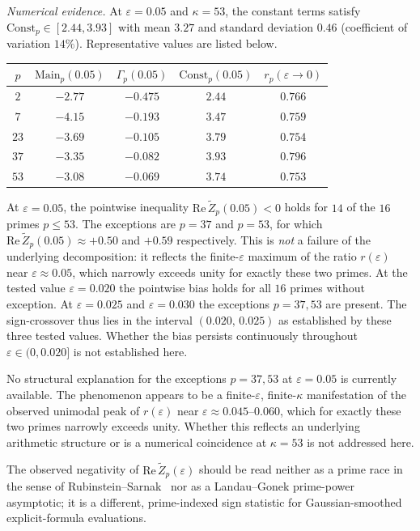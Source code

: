 \documentclass[11pt]{article}
\newcommand{\Zt}{\widetilde{Z}}
\begin{document}
\emph{Numerical evidence.}
At $\varepsilon=0.05$ and $\kappa=53$, the constant terms satisfy
$\mathrm{Const}_p\in[2.44,3.93]$ with mean $3.27$ and standard
deviation $0.46$ (coefficient of variation $14\%$).
Representative values are listed below.

\begin{center}
\begin{tabular}{ccccc}
\toprule
$p$ & $\mathrm{Main}_p(0.05)$ & $\Gamma_p(0.05)$
    & $\mathrm{Const}_p(0.05)$ & $r_p(\varepsilon\to 0)$ \\
\midrule
$2$  & $-2.77$ & $-0.475$ & $2.44$ & $0.766$ \\
$7$  & $-4.15$ & $-0.193$ & $3.47$ & $0.759$ \\
$23$ & $-3.69$ & $-0.105$ & $3.79$ & $0.754$ \\
$37$ & $-3.35$ & $-0.082$ & $3.93$ & $0.796$ \\
$53$ & $-3.08$ & $-0.069$ & $3.74$ & $0.753$ \\
\bottomrule
\end{tabular}
\end{center}

At $\varepsilon=0.05$, the pointwise inequality
$\mathrm{Re}\,\Zt_p(0.05)<0$ holds for $14$ of the $16$ primes
$p\le 53$.
The exceptions are $p=37$ and $p=53$, for which
$\mathrm{Re}\,\Zt_p(0.05)\approx+0.50$ and $+0.59$ respectively.
This is \emph{not} a failure of the underlying decomposition: it
reflects the finite-$\varepsilon$ maximum of the ratio $r(\varepsilon)$
near $\varepsilon\approx 0.05$, which narrowly exceeds unity for
exactly these two primes.
At the tested value $\varepsilon=0.020$ the pointwise bias holds for
all $16$ primes without exception.
At $\varepsilon=0.025$ and $\varepsilon=0.030$ the exceptions
$p=37,53$ are present.
The sign-crossover thus lies in the interval $(0.020,\,0.025)$ as
established by these three tested values.
Whether the bias persists continuously throughout
$\varepsilon\in(0,0.020]$ is not established here.

No structural explanation for the exceptions $p=37,53$ at
$\varepsilon=0.05$ is currently available.
The phenomenon appears to be a finite-$\varepsilon$, finite-$\kappa$
manifestation of the observed unimodal peak of $r(\varepsilon)$ near
$\varepsilon\approx 0.045$--$0.060$, which for exactly these two
primes narrowly exceeds unity.
Whether this reflects an underlying arithmetic structure or is a
numerical coincidence at $\kappa=53$ is not addressed here.

The observed negativity of $\mathrm{Re}\,\Zt_p(\varepsilon)$ should
be read neither as a prime race in the sense of
Rubinstein--Sarnak~\cite{RubinsteinSarnak} nor as a Landau--Gonek
prime-power asymptotic; it is a different, prime-indexed sign
statistic for Gaussian-smoothed explicit-formula evaluations.
\end{document}
